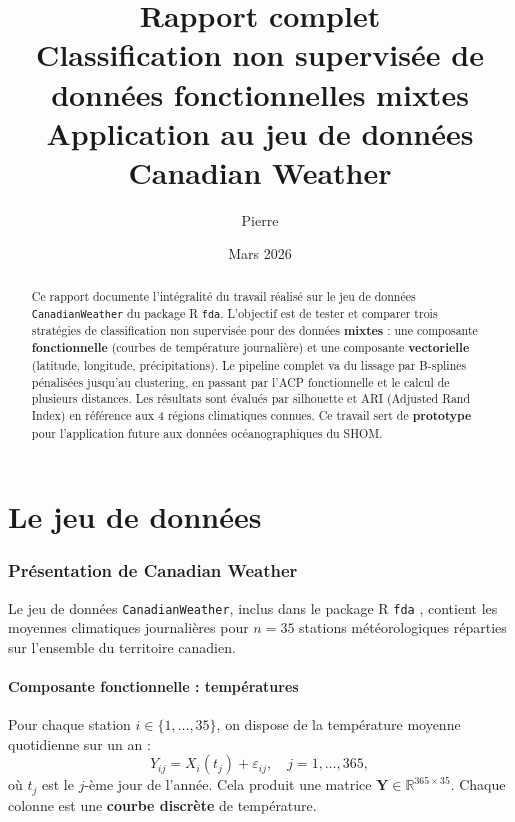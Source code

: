 \documentclass[11pt, a4paper]{article}
\title{%
  \textbf{Rapport complet} \\[0.3em]
  \Large Classification non supervisée de données fonctionnelles mixtes \\[0.2em]
  \large Application au jeu de données Canadian Weather
}
\author{Pierre}
\date{Mars 2026}
\newcommand{\R}{\mathbb{R}}
\theoremstyle{definition}
\theoremstyle{remark}
\begin{document}
\maketitle

\begin{abstract}
Ce rapport documente l'intégralité du travail réalisé sur le jeu de données
\texttt{CanadianWeather} du package R \texttt{fda}. L'objectif est de tester et
comparer trois stratégies de classification non supervisée pour des données
\textbf{mixtes} : une composante \textbf{fonctionnelle} (courbes de température
journalière) et une composante \textbf{vectorielle} (latitude, longitude,
précipitations). Le pipeline complet va du lissage par B-splines pénalisées
jusqu'au clustering, en passant par l'ACP fonctionnelle et le calcul de
plusieurs distances. Les résultats sont évalués par silhouette et ARI (Adjusted
Rand Index) en référence aux 4 régions climatiques connues. Ce travail sert
de \textbf{prototype} pour l'application future aux données océanographiques
du SHOM.
\end{abstract}

\tableofcontents
\newpage

\part{Le jeu de données}

\section{Présentation de Canadian Weather}

Le jeu de données \texttt{CanadianWeather}, inclus dans le package R
\texttt{fda} \cite{ramsay2005}, contient les moyennes climatiques journalières
pour $n = 35$ stations météorologiques réparties sur l'ensemble du territoire
canadien.

\subsection{Composante fonctionnelle : températures}

Pour chaque station $i \in \{1, \ldots, 35\}$, on dispose de la température
moyenne quotidienne sur un an :
\[
  Y_{ij} = X_i(t_j) + \varepsilon_{ij}, \quad j = 1, \ldots, 365,
\]
où $t_j$ est le $j$-ème jour de l'année. Cela produit une matrice
$\mathbf{Y} \in \R^{365 \times 35}$. Chaque colonne est une
\textbf{courbe discrète} de température.
\end{document}
